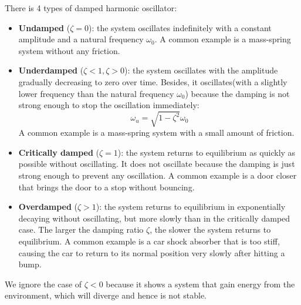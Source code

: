 \begin{intuition}
    There is 4 types of damped harmonic oscillator:
    \begin{itemize}
        \item \textbf{Undamped} ($\zeta = 0$): the system oscillates indefinitely with a constant amplitude and a natural frequency $\omega_0$. A common example is a mass-spring system without any friction.
        \item \textbf{Underdamped} ($\zeta < 1, \zeta > 0$): the system oscillates with the amplitude gradually decreasing to zero over time. Besides, it oscillates(with a slightly lower frequency than the natural frequency $\omega_0$) because the damping is not strong enough to stop the oscillation immediately:
        \[
            \omega_u = \sqrt{1 - \zeta^2} \omega_0
        \]
        A common example is a mass-spring system with a small amount of friction.
        \item \textbf{Critically damped} ($\zeta = 1$): the system returns to equilibrium as quickly as possible without oscillating. It does not oscillate because the damping is just strong enough to prevent any oscillation. A common example is a door closer that brings the door to a stop without bouncing.
        \item \textbf{Overdamped} ($\zeta > 1$): the system returns to equilibrium in exponentially decaying without oscillating, but more slowly than in the critically damped case. The larger the damping ratio $\zeta$, the slower the system returns to equilibrium. A common example is a car shock absorber that is too stiff, causing the car to return to its normal position very slowly after hitting a bump.
    \end{itemize}
\end{intuition}

\bigskip \noindent
\begin{remark}
    We ignore the case of $\zeta < 0$ because it shows a system that gain energy from the environment, which will diverge and hence is not stable. 
\end{remark}







\bigskip \noindent \bigskip \noindent \bigskip \noindent
